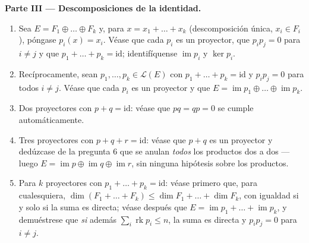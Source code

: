 \begin{problem}
\medskip
\noindent\textbf{Parte III --- Descomposiciones de la identidad.}
\begin{enumerate}[resume]
  \item Sea $E = F_1 \oplus \dots \oplus F_k$ y, para
        $x = x_1 + \dots + x_k$ (descomposición única,
        $x_i \in F_i$), póngase $p_i(x) = x_i$. Véase que cada $p_i$
        es un proyector, que $p_i p_j = 0$ para $i \neq j$ y que
        $p_1 + \dots + p_k = \mathrm{id}$; identifíquense
        $\operatorname{im} p_i$ y $\ker p_i$.
  \item Recíprocamente, sean $p_1, \dots, p_k \in \mathcal{L}(E)$
        con $p_1 + \dots + p_k = \mathrm{id}$ y $p_i p_j = 0$ para
        todos $i \neq j$. Véase que cada $p_i$ es un proyector y que
        $E = \operatorname{im} p_1 \oplus \dots \oplus
        \operatorname{im} p_k$.
  \item Dos proyectores con $p + q = \mathrm{id}$: véase que
        $pq = qp = 0$ se cumple automáticamente.
  \item Tres proyectores con $p + q + r = \mathrm{id}$: véase que
        $p + q$ es un proyector y dedúzcase de la pregunta 6 que se
        anulan \emph{todos} los productos dos a dos --- luego
        $E = \operatorname{im} p \oplus \operatorname{im} q \oplus
        \operatorname{im} r$, sin ninguna hipótesis sobre los
        productos.
  \item Para $k$ proyectores con $p_1 + \dots + p_k = \mathrm{id}$:
        véase primero que, para  cualesquiera,
        $\dim (F_1 + \dots + F_k) \leq \dim F_1 + \dots + \dim F_k$,
        con igualdad si y solo si la suma es directa; véase después
        que $E = \operatorname{im} p_1 + \dots + \operatorname{im}
        p_k$, y demuéstrese que \emph{si} además
        $\sum_i \operatorname{rk} p_i \leq n$, la suma es directa y
        $p_i p_j = 0$ para $i \neq j$.
\end{enumerate}


\end{problem}
